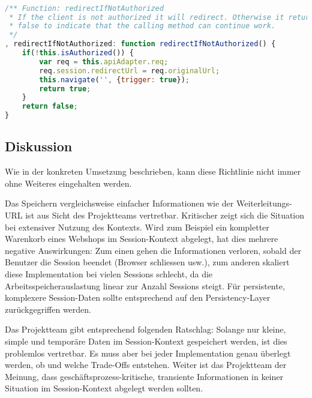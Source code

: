 \begin{lstlisting}[language=JavaScript, caption=Router - Autorisationskontrolle \cite{roomiesRouter}, label=lst:router-set-redirecturl, firstnumber=225]

/** Function: redirectIfNotAuthorized
 * If the client is not authorized it will redirect. Otherwise it returns
 * false to indicate that the calling method can continue work.
 */
, redirectIfNotAuthorized: function redirectIfNotAuthorized() {
	if(!this.isAuthorized()) {
		var req = this.apiAdapter.req;
		req.session.redirectUrl = req.originalUrl;
		this.navigate('', {trigger: true});
		return true;
	}
	return false;
}
\end{lstlisting}


\subsection*{Diskussion}
Wie in der konkreten Umsetzung beschrieben, kann diese Richtlinie nicht immer ohne Weiteres eingehalten werden.

Das Speichern vergleichsweise einfacher Informationen wie der Weiterleitungs-\gls{URL} ist aus Sicht des Projektteams vertretbar. Kritischer zeigt sich die Situation bei extensiver Nutzung des Kontexts. Wird zum Beispiel ein kompletter Warenkorb eines Webshops im Session-Kontext abgelegt, hat dies mehrere negative Auswirkungen: Zum einen gehen die Informationen verloren, sobald der Benutzer die Session beendet (Browser schliessen usw.), zum anderen skaliert diese Implementation bei vielen Sessions schlecht, da die Arbeitsspeicherauslastung linear zur Anzahl Sessions steigt. Für persistente, komplexere Session-Daten sollte entsprechend auf den Persistency-Layer zurückgegriffen werden.

Das Projektteam gibt entsprechend folgenden Ratschlag: Solange nur kleine, simple und temporäre Daten im Session-Kontext gespeichert werden, ist dies problemlos vertretbar. Es muss aber bei jeder Implementation genau überlegt werden, ob und welche Trade-Offs entstehen.
Weiter ist das Projektteam der Meinung, dass geschäftsprozess-kritische, transiente Informationen in keiner Situation im Session-Kontext abgelegt werden sollten.
